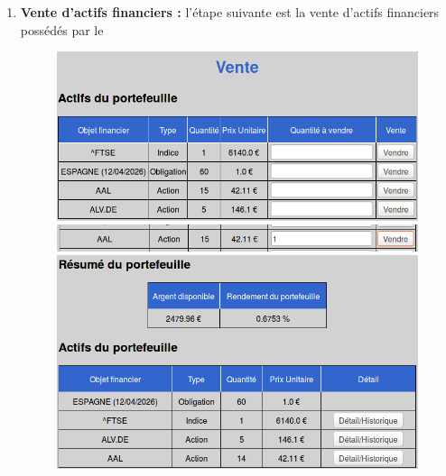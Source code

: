 \begin{enumerate}
      \item \textbf{Vente d'actifs financiers :} l'étape suivante est la vente d'actifs financiers possédés par le
      \begin{figure}[H]
	\center
	\includegraphics[scale=0.5]{../graph/7-vente.png}
	\includegraphics[scale=0.5]{../graph/7-vente1action.png}
	\includegraphics[scale=0.5]{../graph/7-accueilapresvente.png}
      \end{figure}
	

\end{enumerate}
